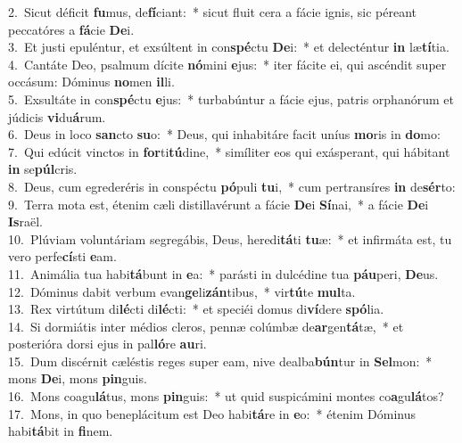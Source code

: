 {2.~}Sicut déficit \textbf{fu}mus, de\textbf{fí}ciant:~* sicut fluit cera a fácie ignis, sic péreant peccatóres a \textbf{fá}cie \textbf{De}i.\\
{3.~}Et justi epuléntur, et exsúltent in con\textbf{spé}ctu \textbf{De}i:~* et delecténtur \textbf{in} læ\textbf{tí}tia.\\
{4.~}Cantáte Deo, psalmum dícite \textbf{nó}mini \textbf{e}jus:~* iter fácite ei, qui ascéndit super occásum: Dóminus \textbf{no}men \textbf{il}li.\\
{5.~}Exsultáte in con\textbf{spé}ctu \textbf{e}jus:~* turbabúntur a fácie ejus, patris orphanórum et júdicis \textbf{vi}du\textbf{á}rum.\\
{6.~}Deus in loco \textbf{san}cto \textbf{su}o:~* Deus, qui inhabitáre facit uníus \textbf{mo}ris in \textbf{do}mo:\\
{7.~}Qui edúcit vinctos in \textbf{for}ti\textbf{tú}dine,~* simíliter eos qui exásperant, qui hábitant \textbf{in} se\textbf{púl}cris.\\
{8.~}Deus, cum egrederéris in conspéctu \textbf{pó}puli \textbf{tu}i,~* cum pertransíres \textbf{in} de\textbf{sér}to:\\
{9.~}Terra mota est, étenim cæli distillavérunt a fácie \textbf{De}i \textbf{Sí}nai,~* a fácie \textbf{De}i \textbf{Is}raël.\\
{10.~}Plúviam voluntáriam segregábis, Deus, heredi\textbf{tá}ti \textbf{tu}æ:~* et infirmáta est, tu vero perfe\textbf{cí}sti \textbf{e}am.\\
{11.~}Animália tua habi\textbf{tá}bunt in \textbf{e}a:~* parásti in dulcédine tua \textbf{páu}peri, \textbf{De}us.\\
{12.~}Dóminus dabit verbum evan\textbf{ge}li\textbf{zán}tibus,~* vir\textbf{tú}te \textbf{mul}ta.\\
{13.~}Rex virtútum di\textbf{lé}cti di\textbf{lé}cti:~* et speciéi domus di\textbf{ví}dere \textbf{spó}lia.\\
{14.~}Si dormiátis inter médios cleros, pennæ colúmbæ de\textbf{ar}gen\textbf{tá}tæ,~* et posterióra dorsi ejus in pal\textbf{ló}re \textbf{au}ri.\\
{15.~}Dum discérnit cæléstis reges super eam, nive dealba\textbf{bún}tur in \textbf{Sel}mon:~* mons \textbf{De}i, mons \textbf{pin}guis.\\
{16.~}Mons coagu\textbf{lá}tus, mons \textbf{pin}guis:~* ut quid suspicámini montes co\textbf{a}gu\textbf{lá}tos?\\
{17.~}Mons, in quo beneplácitum est Deo habi\textbf{tá}re in \textbf{e}o:~* étenim Dóminus habi\textbf{tá}bit in \textbf{fi}nem.\\
